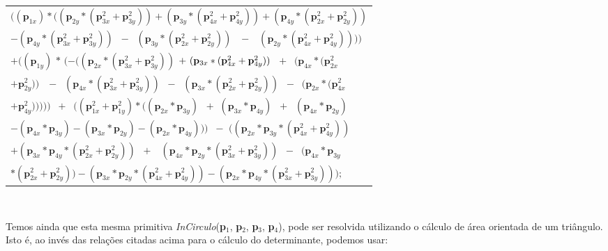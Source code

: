 \documentclass[12pt,a4paper]{book}
\begin{document}
\begin{tabular}[t]{l}
$((\mathbf{p}_{1x})\ast ((\mathbf{p}_{2y}\ast (\mathbf{p}_{3x}^{2}+\mathbf{p}%
_{3y}^{2}))+(\mathbf{p}_{3y}\ast (\mathbf{p}_{4x}^{2}+\mathbf{p}_{4y}^{2}))+(%
\mathbf{p}_{4y}\ast (\mathbf{p}_{2x}^{2}+\mathbf{p}_{2y}^{2}))$ \\ 
$-(\mathbf{p}_{4y}\ast (\mathbf{p}_{3x}^{2}+\mathbf{p}_{3y}^{2}))$ $\ -$ $\ (%
\mathbf{p}_{3y}\ast (\mathbf{p}_{2x}^{2}+\mathbf{p}_{2y}^{2}))$ $\ \ -$ $\ \
(\mathbf{p}_{2y}\ast (\mathbf{p}_{4x}^{2}+\mathbf{p}_{4y}^{2}))))$ \\ 
$+((\mathbf{p}_{1y})$ $\ast $ $(-((\mathbf{p}_{2x}\ast (\mathbf{p}_{3x}^{2}+%
\mathbf{p}_{3y}^{2}))$ $+\ (\mathbf{p}_{3x}\ast (\mathbf{p}_{4x}^{2}+\mathbf{%
p}_{4y}^{2}))$ $\ +$ $\ (\mathbf{p}_{4x}\ast (\mathbf{p}_{2x}^{2}$ \\ 
$+\mathbf{p}_{2y}^{2}))$ $\ \ -$ $\ (\mathbf{p}_{4x}\ast (\mathbf{p}%
_{3x}^{2}+\mathbf{p}_{3y}^{2}))$ $\ -$ $\ (\mathbf{p}_{3x}\ast (\mathbf{p}%
_{2x}^{2}+\mathbf{p}_{2y}^{2}))$ $\ -$ $\ (\mathbf{p}_{2x}\ast (\mathbf{p}%
_{4x}^{2}$ \\ 
$+\mathbf{p}_{4y}^{2})))))$ $\ +$ $\ ((\mathbf{p}_{1x}^{2}+\mathbf{p}%
_{1y}^{2})\ast ((\mathbf{p}_{2x}\ast \mathbf{p}_{3y})$ $\ +$ $(\mathbf{p}%
_{3x}\ast \mathbf{p}_{4y})$ $\ +$ $\ (\mathbf{p}_{4x}\ast \mathbf{p}_{2y})$
\\ 
$-(\mathbf{p}_{4x}\ast \mathbf{p}_{3y})-(\mathbf{p}_{3x}\ast \mathbf{p}%
_{2y})-(\mathbf{p}_{2x}\ast \mathbf{p}_{4y})))$ $\ -$ $((\mathbf{p}_{2x}\ast 
\mathbf{p}_{3y}\ast (\mathbf{p}_{4x}^{2}+\mathbf{p}_{4y}^{2}))$ \\ 
$+(\mathbf{p}_{3x}\ast \mathbf{p}_{4y}\ast (\mathbf{p}_{2x}^{2}+\mathbf{p}%
_{2y}^{2}))$ $\ +$ $\ \ (\mathbf{p}_{4x}\ast \mathbf{p}_{2y}\ast (\mathbf{p}%
_{3x}^{2}+\mathbf{p}_{3y}^{2}))$ $\ -$ $\ (\mathbf{p}_{4x}\ast \mathbf{p}%
_{3y}$ \\ 
$\ast (\mathbf{p}_{2x}^{2}+\mathbf{p}_{2y}^{2}))-(\mathbf{p}_{3x}\ast 
\mathbf{p}_{2y}\ast (\mathbf{p}_{4x}^{2}+\mathbf{p}_{4y}^{2}))-(\mathbf{p}%
_{2x}\ast \mathbf{p}_{4y}\ast (\mathbf{p}_{3x}^{2}+\mathbf{p}_{3y}^{2})));$%
\end{tabular}

\ \ \ \ \ \ \ \ \ \ \ \ \ \ \ 

Temos ainda que esta mesma primitiva \textit{InCirculo}(\textbf{p}$_{1}$, 
\textbf{p}$_{2}$, \textbf{p}$_{3}$, \textbf{p}$_{4}$), pode ser resolvida
utilizando o c\'{a}lculo de \'{a}rea orientada de um tri\^{a}ngulo. Isto 
\'{e}, ao inv\'{e}s das rela\c{c}\~{o}es citadas acima para o c\'{a}lculo do
determinante, podemos usar:
\end{document}
